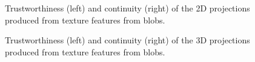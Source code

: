 
\clearpage
\begin{figure}[H]
	\centering
	\caption{Trustworthiness (left) and continuity (right) of the 2D projections produced from texture features from blobs.}\label{fig:TC_2d_texture}
\end{figure}

\begin{figure}[H]
	\centering
	\caption{Trustworthiness (left) and continuity (right) of the 3D projections produced from texture features from blobs.}\label{fig:TC_3d_texture}
\end{figure}

